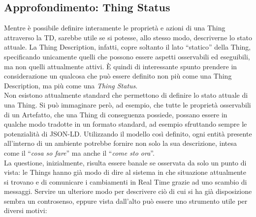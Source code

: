 \documentclass[12pt,a4paper,openright,oneside]{report}
\newcommand{\quotes}[1]{``#1''}
\begin{document}
\subsection{Approfondimento: Thing Status}
\label{sec:thing_status}
Mentre è possibile definire interamente le proprietà e azioni di una Thing attraverso la TD, sarebbe utile se si potesse, allo stesso modo, descriverne lo stato attuale. La Thing Description, infatti, copre soltanto il lato \quotes{statico} della Thing, specificando unicamente quelli che possono essere aspetti osservabili ed eseguibili, ma non quelli attualmente attivi. È quindi di interessante spunto prendere in considerazione un qualcosa che può essere definito non più come una Thing Description, ma più come una \textit{Thing Status}.\\

Non esistono attualmente standard che permettono di definire lo stato attuale di una Thing. Si può immaginare però, ad esempio, che tutte le proprietà osservabili di un Artefatto, che una Thing di conseguenza possiede, possano essere in qualche modo tradotte in un formato standard, ad esempio sfruttando sempre le potenzialità di JSON-LD. Utilizzando il modello così definito, ogni entità presente all'interno di un ambiente potrebbe fornire non solo la sua descrizione, intesa come il \quotes{\textit{cosa so fare}} ma anche il \quotes{\textit{come sto ora}}.\\

La questione, inizialmente, risulta essere banale se osservata da solo un punto di vista: le Things hanno già modo di dire al sistema in che situazione attualmente si trovano e di comunicare i cambiamenti in Real Time grazie ad uno scambio di messaggi. Servire un ulteriore modo per descrivere ciò di cui si ha già disposizione sembra un controsenso, eppure vista dall'alto può essere uno strumento utile per diversi motivi:
\end{document}
